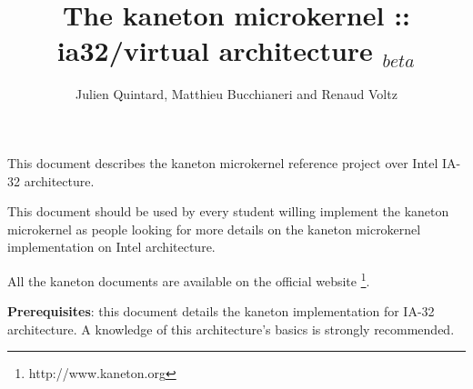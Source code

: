 
%
%

\newcommand{\path}{../../..}

%
%



%
%

\rhead{}

%
%

\title{The kaneton microkernel :: ia32/virtual architecture $_{beta}$
       \logos}

%
%

\author{\small{Julien Quintard},
        \small{Matthieu Bucchianeri} and
        \small{Renaud Voltz}}

%
%



%
%

\maketitle

%
%

This document describes the kaneton microkernel reference project over
Intel IA-32 architecture.

This document should be used by every student willing implement the
kaneton microkernel as people looking for more details on the kaneton
microkernel implementation on Intel architecture.

All the kaneton documents are available on
the official website
  \footnote{http://www.kaneton.org}.

\textbf{Prerequisites}: this document details the kaneton implementation
for IA-32 architecture. A knowledge of this architecture's basics is
strongly recommended.

%
%

\tableofcontents

%
%











